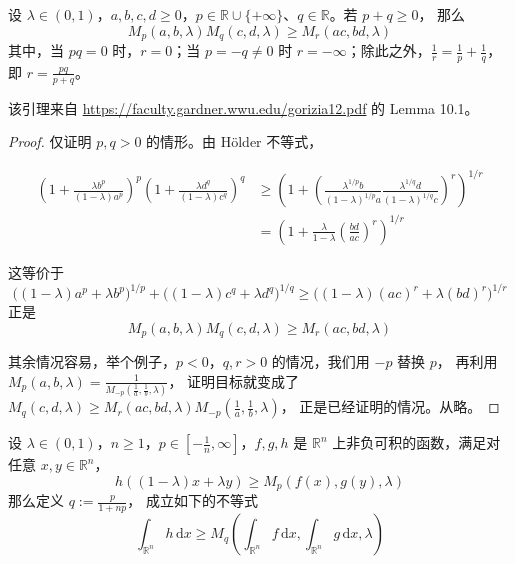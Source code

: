 \begin{lemma}\label{lem:power_mean_inequality}
设 $\lambda\in(0,1)$，$a,b,c,d\ge 0$，$p\in\mathbb{R}\cup\{+\infty\}$、$q\in\mathbb{R}$。若 $p+q\ge 0$， 那么
\[
M_p(a,b,\lambda)M_q(c,d,\lambda)\ge M_r(ac,bd,\lambda)
\]
其中，当 $pq=0$ 时，$r=0$；当 $p=-q\ne 0$ 时 $r=-\infty$；除此之外，$\frac1r=\frac{1}{p}+\frac{1}{q}$， 即 $r=\frac{pq}{p+q}$。
\end{lemma}
\begin{remark}
    该引理来自 \url{https://faculty.gardner.wwu.edu/gorizia12.pdf} 的 Lemma 10.1。
\end{remark}
\begin{proof}
    
仅证明 $p,q>0$ 的情形。由 Hölder 不等式，
 
\begin{align*}
\left(1+\frac{\lambda b^{p}}{(1-\lambda)a^{p}}\right)^{p}\left(1+\frac{\lambda d^{q}}{(1-\lambda)c^{q}}\right)^{q}&\ge\left(1+\left(\frac{\lambda^{1/p}b}{(1-\lambda)^{1/p}a}\frac{\lambda^{1/q}d}{(1-\lambda)^{1/q}c}\right)^r\right)^{1/r}\\
&=\left(1+\frac{\lambda}{1-\lambda}\left(\frac{bd}{ac}\right)^r\right)^{1/r}
\end{align*}
 
这等价于
\[
\big((1-\lambda)a^p+\lambda b^p\big)^{1/p}+\big((1-\lambda)c^q+\lambda d^q\big)^{1/q}\ge \big((1-\lambda)(ac)^r+\lambda(bd)^r\big)^{1/r}
\]
正是
\[
M_p(a,b,\lambda)M_q(c,d,\lambda)\ge M_{r}(ac,bd,\lambda)
\]

其余情况容易，举个例子，$p<0$，$q,r>0$ 的情况，我们用 $-p$ 替换 $p$， 再利用 $\displaystyle M_p(a,b,\lambda)=\frac1{M_{-p}\left(\frac1a,\frac1b,\lambda\right)}$， 证明目标就变成了 $M_q(c,d,\lambda)\ge M_r(ac,bd,\lambda)M_{-p}\left(\frac1a,\frac1b,\lambda\right)$， 正是已经证明的情况。从略。
\end{proof}



\begin{theorem}\label{thm:BBL}
设 $\lambda\in(0,1)$，$n\ge 1$，$p\in\left[-\frac1n,\infty\right]$，$f,g,h$ 是 $\mathbb{R}^n$ 上非负可积的函数，满足对任意 $x,y\in\mathbb{R}^n$，
\begin{equation}
h((1-\lambda)x+\lambda y)\ge M_p(f(x),g(y),\lambda) \label{eq:2-6}\tag{2-6}
\end{equation}
那么定义 $q:=\frac{p}{1+np}$， 成立如下的不等式
\[
\int_{\mathbb{R}^n}h \,\mathrm{d}x\geq M_{q}\left(\int_{\mathbb{R}^n}f \,\mathrm{d}x,\int_{\mathbb{R}^n}g \,\mathrm{d}x,\lambda\right)
\]
\end{theorem}

